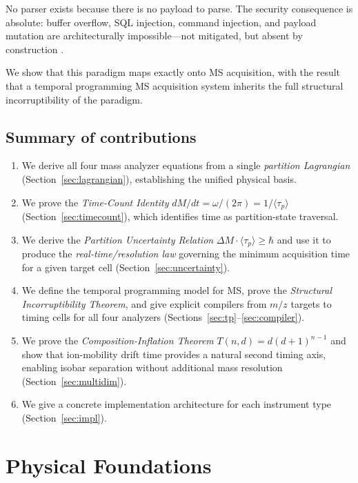 \documentclass[twocolumn,10pt,a4paper]{article}
\theoremstyle{thmstyle}
\theoremstyle{definition}
\theoremstyle{remark}
\newcommand{\tp}{\langle\tau_{p}\rangle}
\begin{document}
No parser exists because there is no payload to parse. The security
consequence is absolute: buffer overflow, SQL injection, command
injection, and payload mutation are architecturally impossible---not
mitigated, but absent by construction \citep{saltzer1975}.

We show that this paradigm maps exactly onto MS acquisition, with the
result that a temporal programming MS acquisition system inherits the
full structural incorruptibility of the paradigm.

\subsection{Summary of contributions}

\begin{enumerate}[nosep,label=(\roman*)]
\item We derive all four mass analyzer equations from a single
  \emph{partition Lagrangian} (Section~\ref{sec:lagrangian}), establishing
  the unified physical basis.
\item We prove the \emph{Time-Count Identity}
  $dM/dt = \omega/(2\pi) = 1/\tp$ (Section~\ref{sec:timecount}), which
  identifies time as partition-state traversal.
\item We derive the \emph{Partition Uncertainty Relation}
  $\Delta M \cdot \tp \geq \hbar$ and use it to produce the
  \emph{real-time/resolution law} governing the minimum acquisition time
  for a given target cell (Section~\ref{sec:uncertainty}).
\item We define the temporal programming model for MS, prove the
  \emph{Structural Incorruptibility Theorem}, and give explicit compilers
  from $m/z$ targets to timing cells for all four analyzers
  (Sections~\ref{sec:tp}--\ref{sec:compiler}).
\item We prove the \emph{Composition-Inflation Theorem}
  $T(n,d) = d(d+1)^{n-1}$ and show that ion-mobility drift time provides
  a natural second timing axis, enabling isobar separation without
  additional mass resolution (Section~\ref{sec:multidim}).
\item We give a concrete implementation architecture for each instrument
  type (Section~\ref{sec:impl}).
\end{enumerate}

\section{Physical Foundations}
\label{sec:physics}
\end{document}
